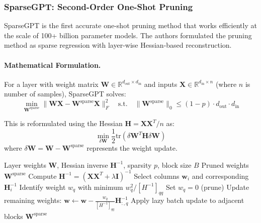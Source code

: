 \subsubsection{SparseGPT: Second-Order One-Shot Pruning \cite{frantar2023sparsegpt}}

SparseGPT \cite{frantar2023sparsegpt} is the first accurate one-shot pruning method that works efficiently at the scale of 100+ billion parameter models. The authors formulated the pruning method as sparse regression with layer-wise Hessian-based reconstruction.

\paragraph{Mathematical Formulation.}
For a layer with weight matrix $\mathbf{W} \in \mathbb{R}^{d_{\text{out}} \times d_{\text{in}}}$ and inputs $\mathbf{X} \in \mathbb{R}^{d_{\text{in}} \times n}$ (where $n$ is number of samples), SparseGPT solves:
\begin{equation}
	\min_{\mathbf{W}^{\text{sparse}}} \|\mathbf{W}\mathbf{X} - \mathbf{W}^{\text{sparse}}\mathbf{X}\|_F^2 \quad \text{s.t.} \quad \|\mathbf{W}^{\text{sparse}}\|_0 \leq (1-p) \cdot d_{\text{out}} \cdot d_{\text{in}}
\end{equation}

This is reformulated using the Hessian $\mathbf{H} = \mathbf{X}\mathbf{X}^T / n$ as:
\begin{equation}
	\min_{\delta \mathbf{W}} \frac{1}{2} \text{tr}(\delta \mathbf{W}^T \mathbf{H} \delta \mathbf{W})
\end{equation}
where $\delta \mathbf{W} = \mathbf{W} - \mathbf{W}^{\text{sparse}}$ represents the weight update.


\begin{algorithm}[H]
	\caption{SparseGPT}
	\begin{algorithmic}[1]
		\REQUIRE Layer weights $\mathbf{W}$, Hessian inverse $\mathbf{H}^{-1}$, sparsity $p$, block size $B$
		\ENSURE Pruned weights $\mathbf{W}^{\text{sparse}}$
		\STATE Compute $\mathbf{H}^{-1} = (\mathbf{X}\mathbf{X}^T + \lambda \mathbf{I})^{-1}$
		\STATE Select columns $\mathbf{w}_i$ and corresponding $\mathbf{H}^{-1}_i$
		\STATE Identify weight $w_q$ with minimum $w_q^2 / [H^{-1}]_{qq}$
		\STATE Set $w_q = 0$ (prune)
		\STATE Update remaining weights: $\mathbf{w} \gets \mathbf{w} - \frac{w_q}{[H^{-1}]_{qq}} \mathbf{H}^{-1}_{:,q}$
		\ENDFOR
		\STATE Apply lazy batch update to adjacent blocks
		\ENDFOR
		\RETURN $\mathbf{W}^{\text{sparse}}$
	\end{algorithmic}
\end{algorithm}


